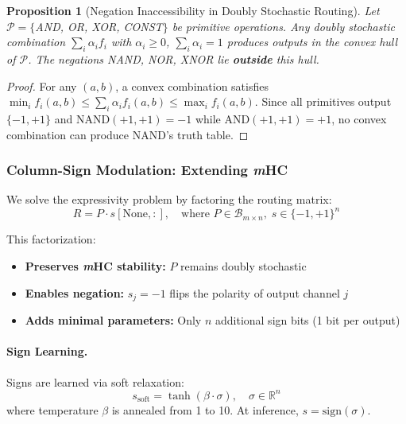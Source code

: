 \documentclass[Royal,times,sageh]{sagej}
\newcommand{\sign}{\text{sign}}
\newcommand{\mHC}{\textit{m}HC}
\newtheorem{proposition}{Proposition}
\begin{document}
\begin{proposition}[Negation Inaccessibility in Doubly Stochastic Routing]
\label{prop:negation}
Let $\mathcal{P} = \{$AND, OR, XOR, CONST$\}$ be primitive operations. Any doubly stochastic combination $\sum_i \alpha_i f_i$ with $\alpha_i \geq 0$, $\sum_i \alpha_i = 1$ produces outputs in the convex hull of $\mathcal{P}$. The negations NAND, NOR, XNOR lie \textbf{outside} this hull.
\end{proposition}

\begin{proof}
For any $(a,b)$, a convex combination satisfies $\min_i f_i(a,b) \leq \sum_i \alpha_i f_i(a,b) \leq \max_i f_i(a,b)$. Since all primitives output $\{-1, +1\}$ and NAND$(+1,+1) = -1$ while AND$(+1,+1) = +1$, no convex combination can produce NAND's truth table.
\end{proof}

\subsubsection{Column-Sign Modulation: Extending \mHC}

We solve the expressivity problem by factoring the routing matrix:
\begin{equation}
    R = P \cdot s[\text{None}, :], \quad \text{where } P \in \mathcal{B}_{m \times n}, \; s \in \{-1, +1\}^n
\end{equation}

This factorization:
\begin{itemize}
    \item \textbf{Preserves \mHC{} stability:} $P$ remains doubly stochastic
    \item \textbf{Enables negation:} $s_j = -1$ flips the polarity of output channel $j$
    \item \textbf{Adds minimal parameters:} Only $n$ additional sign bits (1 bit per output)
\end{itemize}

\paragraph{Sign Learning.} Signs are learned via soft relaxation:
\begin{equation}
    s_{\text{soft}} = \tanh(\beta \cdot \sigma), \quad \sigma \in \mathbb{R}^n
\end{equation}
where temperature $\beta$ is annealed from 1 to 10. At inference, $s = \sign(\sigma)$.
\end{document}
